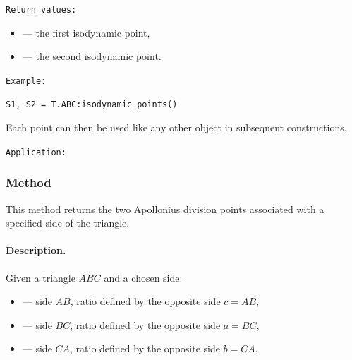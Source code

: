 \medskip
\texttt{Return values: }
\begin{itemize}
  \item {} — the first isodynamic point,
  \item {} — the second isodynamic point.
\end{itemize}

\medskip
\texttt{Example: }
\begin{verbatim}
S1, S2 = T.ABC:isodynamic_points()
\end{verbatim}

Each point can then be used like any other  object in subsequent constructions.

\medskip
\texttt{Application: }

\begin{tkzexample}[vbox]
\begin{center}
\end{center}
\end{tkzexample}


\subsubsection{Method }
\label{ssub:apollonius_points}

This method returns the two Apollonius division points associated with a
specified side of the triangle.

\medskip

\paragraph{Description.}
Given a triangle $ABC$ and a chosen side:

\begin{itemize}
  \item {} — side $AB$, ratio defined by the opposite side $c = AB$,
  \item {} — side $BC$, ratio defined by the opposite side $a = BC$,
  \item {} — side $CA$, ratio defined by the opposite side $b = CA$,
\end{itemize}

